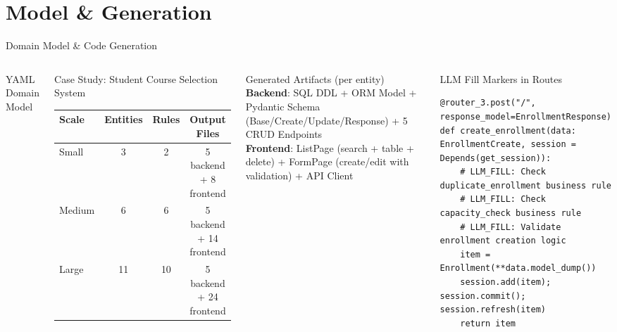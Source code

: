 \documentclass[10pt,aspectratio=169]{beamer}
\begin{document}
\section{Model \& Generation}
\begin{frame}[fragile]{Domain Model \& Code Generation}
\vspace{-6pt}

\begin{columns}[T]
\begin{block}{YAML Domain Model}

\end{block}

\begin{block}{Case Study: Student Course Selection System}
\begin{center}
\setlength{\tabcolsep}{4pt}
\begin{tabular}{lccc}
\toprule
\textbf{Scale} & \textbf{Entities} & \textbf{Rules} & \textbf{Output Files} \\
\midrule
Small  & 3  & 2  & 5 backend + 8 frontend \\
Medium & 6  & 6  & 5 backend + 14 frontend \\
Large  & 11 & 10 & 5 backend + 24 frontend \\
\bottomrule
\end{tabular}
\end{center}
\end{block}

\begin{block}{Generated Artifacts (per entity)}
\textbf{Backend}: SQL DDL + ORM Model + Pydantic Schema (Base/Create/Update/Response) + 5 CRUD Endpoints \\
\textbf{Frontend}: ListPage (search + table + delete) + FormPage (create/edit with validation) + API Client
\end{block}

\vspace{8pt}
\begin{block}{LLM Fill Markers in Routes}
\tiny
\begin{lstlisting}[style=smallcode]
@router_3.post("/", response_model=EnrollmentResponse)
def create_enrollment(data: EnrollmentCreate, session = Depends(get_session)):
    # LLM_FILL: Check duplicate_enrollment business rule
    # LLM_FILL: Check capacity_check business rule
    # LLM_FILL: Validate enrollment creation logic
    item = Enrollment(**data.model_dump())
    session.add(item); session.commit(); session.refresh(item)
    return item
\end{lstlisting}
\end{block}
\end{columns}

\end{frame}
\end{document}
